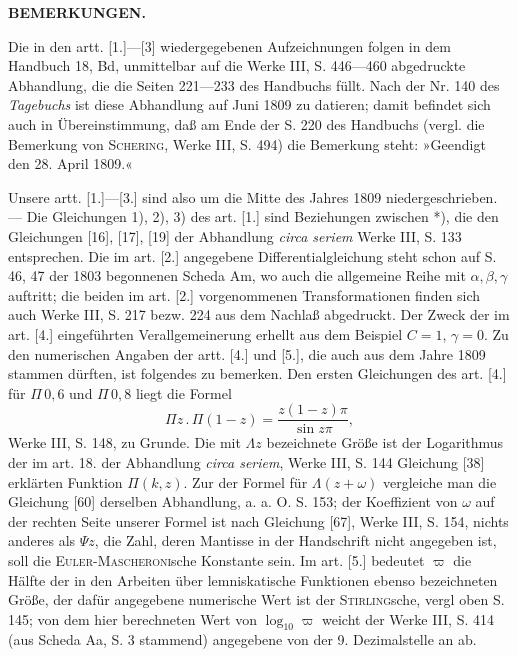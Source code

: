 \begingroup
{}
\begin{center}\bfseries BEMERKUNGEN.\end{center}
\par\indent Die in den artt. [1.]---[3] wiedergegebenen Aufzeichnungen folgen in dem Handbuch 18, Bd, unmittelbar auf die Werke III, S. 446---460 abgedruckte Abhandlung, die die Seiten 221---233 des Handbuchs füllt.
Nach der Nr. 140 des \textit{Tagebuchs} ist diese Abhandlung auf Juni 1809 zu datieren; damit befindet sich auch in Übereinstimmung, daß am Ende der S. 220 des Handbuchs (vergl. die Bemerkung von \textsc{Schering}, Werke III, S. 494) die Bemerkung steht: »Geendigt den 28. April 1809.«
\par\indent Unsere artt. [1.]---[3.] sind also um die Mitte des Jahres 1809 niedergeschrieben. --- Die Gleichungen 1), 2), 3) des art. [1.] sind Beziehungen zwischen *), die den Gleichungen [16], [17], [19] der Abhandlung \textit{circa seriem} Werke III, S. 133 entsprechen.
Die im art. [2.] angegebene Differentialgleichung steht schon auf S. 46, 47 der 1803 begonnenen Scheda Am, wo auch die allgemeine Reihe mit $\alpha,\beta,\gamma$ auftritt; die beiden im art. [2.] vorgenommenen Transformationen finden sich auch Werke III, S. 217 bezw. 224 aus dem Nachlaß abgedruckt.
Der Zweck der im art. [4.] eingeführten Verallgemeinerung erhellt aus dem Beispiel $C=1$, $\gamma=0$.
Zu den numerischen Angaben der artt. [4.] und [5.], die auch aus dem Jahre 1809 stammen dürften, ist folgendes zu bemerken. Den ersten Gleichungen des art. [4.] für $\Pi\,0{,}6$ und $\Pi\,0{,}8$ liegt die Formel
\[\Pi z\,{.}\,\Pi(1-z)=\frac{z(1-z)\pi}{\sin z\pi},\]
\noindent Werke III, S. 148, zu Grunde.
Die mit $\Lambda z$ bezeichnete Größe ist der Logarithmus der im art. 18. der Abhandlung \textit{circa seriem}, Werke III, S. 144 Gleichung [38] erklärten Funktion $\Pi(k,z)$.
Zur der Formel für $\Lambda(z+\omega)$ vergleiche man die Gleichung [60] derselben Abhandlung, a. a. O. S. 153; der Koeffizient von $\omega$ auf der rechten Seite unserer Formel ist nach Gleichung [67], Werke III, S. 154, nichts anderes als $\Psi z$, die Zahl, deren Mantisse in der Handschrift nicht angegeben ist, soll die \textsc{Euler-Mascheroni}sche Konstante sein.
Im art. [5.] bedeutet $\varpi$ die Hälfte der in den Arbeiten über lemniskatische Funktionen ebenso bezeichneten Größe, der dafür angegebene numerische Wert ist der \textsc{Stirling}sche, vergl oben S. 145; von dem hier berechneten Wert von $\log_{10}\varpi$ weicht der Werke III, S. 414 (aus Scheda Aa, S. 3 stammend) angegebene von der 9. Dezimalstelle an ab.
